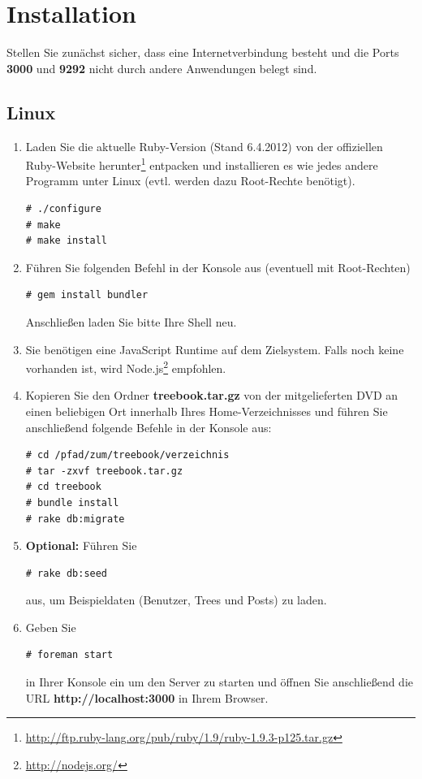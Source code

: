 \documentclass[10pt,a4paper]{book}
\begin{document}
\chapter{Installation}
Stellen Sie zunächst sicher, dass eine Internetverbindung besteht und die Ports \textbf{3000} und \textbf{9292} nicht durch andere Anwendungen belegt sind.
\section{Linux}
\begin{enumerate}
\item Laden Sie die aktuelle Ruby-Version (Stand 6.4.2012) von der offiziellen Ruby-Website herunter\footnote{\href{http://ftp.ruby-lang.org/pub/ruby/1.9/ruby-1.9.3-p125.tar.gz}{http://ftp.ruby-lang.org/pub/ruby/1.9/ruby-1.9.3-p125.tar.gz}} entpacken und installieren es wie jedes andere Programm unter Linux (evtl. werden dazu Root-Rechte benötigt).
\lstset{language=bash}
\begin{lstlisting}
# ./configure
# make
# make install
\end{lstlisting}
\item Führen Sie folgenden Befehl in der Konsole aus (eventuell mit Root-Rechten)
\begin{lstlisting}
# gem install bundler
\end{lstlisting}
Anschließen laden Sie bitte Ihre Shell neu.
\item Sie benötigen eine JavaScript Runtime auf dem Zielsystem. Falls noch keine vorhanden ist, wird Node.js\footnote{\href{http://nodejs.org/}{http://nodejs.org/}} empfohlen.
\item Kopieren Sie den Ordner \textbf{treebook.tar.gz} von der mitgelieferten DVD an einen beliebigen Ort innerhalb Ihres Home-Verzeichnisses und führen Sie anschließend folgende Befehle in der Konsole aus:
\begin{lstlisting}
# cd /pfad/zum/treebook/verzeichnis
# tar -zxvf treebook.tar.gz
# cd treebook
# bundle install
# rake db:migrate
\end{lstlisting}
\item \textbf{Optional:} Führen Sie
\begin{lstlisting}
# rake db:seed
\end{lstlisting}
aus, um Beispieldaten (Benutzer, Trees und Posts) zu laden.
\item Geben Sie
\begin{lstlisting}
# foreman start
\end{lstlisting}
in Ihrer Konsole ein um den Server zu starten und öffnen Sie anschließend die URL \textbf{http://localhost:3000} in Ihrem Browser.
\end{enumerate}
\end{document}

